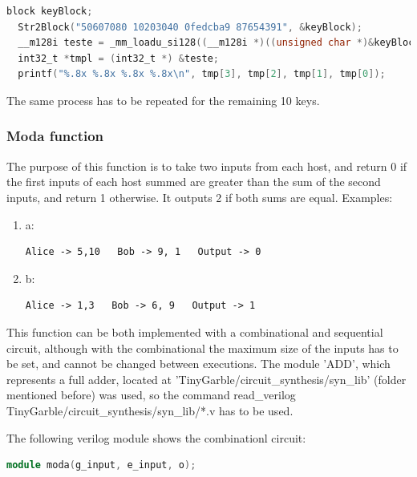 \begin{refsection}
\begin{lstlisting}[caption={Storing four ints into a 128bit register. It should ouput "50607080 10203040 0fedcba9 87654321".}, language=C, captionpos=b]
  block keyBlock;
  Str2Block("50607080 10203040 0fedcba9 87654391", &keyBlock);
  __m128i teste = _mm_loadu_si128((__m128i *)((unsigned char *)&keyBlock));
  int32_t *tmpl = (int32_t *) &teste;
  printf("%.8x %.8x %.8x %.8x\n", tmp[3], tmp[2], tmp[1], tmp[0]);
\end{lstlisting}

The same process has to be repeated for the remaining 10 keys.

\subsubsection{Moda function}

The purpose of this function is to take two inputs from each host, and return 0 if the first inputs of each host summed are greater than the sum of the second inputs, and return 1 otherwise. It outputs 2 if both sums are equal.
Examples:
\begin{enumerate}
\item a: \begin{lstlisting}[caption={Example of moda inputs and output}, captionpos=b]
Alice -> 5,10   Bob -> 9, 1   Output -> 0
\end{lstlisting}
\item b: \begin{lstlisting}[caption={Example of moda inputs and output}, captionpos=b]
Alice -> 1,3   Bob -> 6, 9   Output -> 1
\end{lstlisting}
\end{enumerate}

This function can be both implemented with a combinational and sequential circuit, although with the combinational the maximum size of the inputs has to be set, and cannot be changed between executions.
The module 'ADD', which represents a full adder, located at 'TinyGarble/circuit\_synthesis/syn\_lib' (folder mentioned before) was used, so the command read\_verilog TinyGarble/circuit\_synthesis/syn\_lib/*.v has to be used.

The following verilog module shows the combinationl circuit:

\newpage

\begin{lstlisting}[caption={moda.v}, language=Verilog, captionpos=b]
module moda(g_input, e_input, o);


\end{lstlisting}
\end{refsection}
